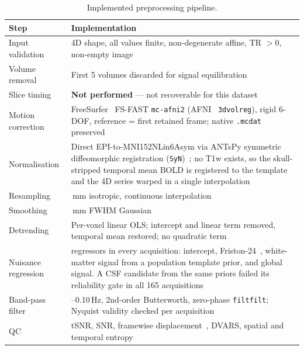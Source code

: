 \documentclass{ssnreview}
\begin{document}
\begin{table}[!htbp]
\centering
\caption{Implemented preprocessing pipeline.}
\label{tab:preproc}
\small
\begin{tabularx}{\textwidth}{@{}l>{\raggedright\arraybackslash}X@{}}
\toprule
\textbf{Step} & \textbf{Implementation} \\
\midrule
Input validation & 4D shape, all values finite, non-degenerate affine, TR $>0$,
non-empty image \\
Volume removal & First 5 volumes discarded for signal equilibration \\
Slice timing & \textbf{Not performed} --- not recoverable for this dataset \\
Motion correction & FreeSurfer~\cite{freesurfer} FS-FAST \texttt{mc-afni2}
(AFNI~\cite{afni} \texttt{3dvolreg}), rigid 6-DOF, reference = first retained frame;
native \texttt{.mcdat} preserved \\
Normalisation & Direct EPI-to-MNI152NLin6Asym via ANTsPy symmetric diffeomorphic
registration (\texttt{SyN})~\cite{ants}; no T1w exists, so the skull-stripped
temporal mean BOLD is registered to the template and the 4D series warped in a
single interpolation \\
Resampling & 4\,mm isotropic, continuous interpolation \\
Smoothing & 6\,mm FWHM Gaussian \\
Detrending & Per-voxel linear OLS; intercept and linear term removed, temporal mean
restored; no quadratic term \\
Nuisance regression & 27 regressors in every acquisition: intercept, Friston-24~\cite{friston24},
white-matter signal from a population template prior, and global signal. A CSF
candidate from the same priors failed its reliability gate in all 165 acquisitions \\
Band-pass filter & 0.01--0.10\,Hz, 2nd-order Butterworth, zero-phase
\texttt{filtfilt}; Nyquist validity checked per acquisition \\
QC & tSNR, SNR, framewise displacement~\cite{fd}, DVARS, spatial and temporal
entropy \\
\bottomrule
\end{tabularx}
\end{table}
\end{document}
